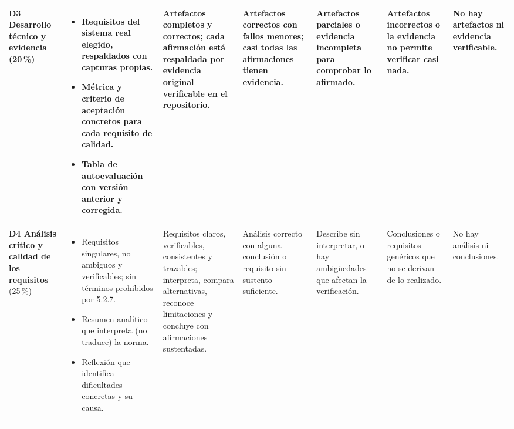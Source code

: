 \documentclass[11pt]{article}
\begin{document}
\begin{landscape}
{\begin{longtable}{|L{2.4cm}|L{5.6cm}|L{3.1cm}|L{2.8cm}|L{2.8cm}|L{2.7cm}|L{2.1cm}|}
	\hline
	\textbf{D3 Desarrollo técnico y evidencia} (20\,\%) & \begin{itemize}[leftmargin=9pt,itemsep=0pt,topsep=0pt,parsep=0pt,partopsep=0pt,after=\vspace{-\baselineskip}]\item Requisitos del sistema real elegido, respaldados con capturas propias.\item Métrica y criterio de aceptación concretos para cada requisito de calidad.\item Tabla de autoevaluación con versión anterior y corregida.\end{itemize} & Artefactos completos y correctos; cada afirmación está respaldada por evidencia original verificable en el repositorio. & Artefactos correctos con fallos menores; casi todas las afirmaciones tienen evidencia. & Artefactos parciales o evidencia incompleta para comprobar lo afirmado. & Artefactos incorrectos o la evidencia no permite verificar casi nada. & No hay artefactos ni evidencia verificable.\\
	\hline
	\textbf{D4 Análisis crítico y calidad de los requisitos} (25\,\%) & \begin{itemize}[leftmargin=9pt,itemsep=0pt,topsep=0pt,parsep=0pt,partopsep=0pt,after=\vspace{-\baselineskip}]\item Requisitos singulares, no ambiguos y verificables; sin términos prohibidos por 5.2.7.\item Resumen analítico que interpreta (no traduce) la norma.\item Reflexión que identifica dificultades concretas y su causa.\end{itemize} & Requisitos claros, verificables, consistentes y trazables; interpreta, compara alternativas, reconoce limitaciones y concluye con afirmaciones sustentadas. & Análisis correcto con alguna conclusión o requisito sin sustento suficiente. & Describe sin interpretar, o hay ambigüedades que afectan la verificación. & Conclusiones o requisitos genéricos que no se derivan de lo realizado. & No hay análisis ni conclusiones.\\
	\hline

\end{longtable}}
\end{landscape}
\end{document}
